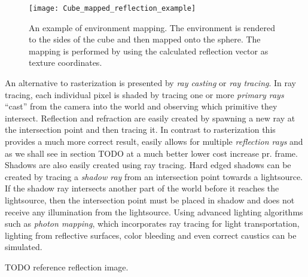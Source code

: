 \begin{figure}
  \centering
  \texttt{[image: Cube\_mapped\_reflection\_example]}
  \caption{An example of environment mapping. The environment is
    rendered to the sides of the cube and then mapped onto the sphere.
    The mapping is performed by using the calculated reflection vector
    as texture coordinates.}
  \label{fig:cubemap}
\end{figure}

An alternative to rasterization is presented by \textit{ray casting}
or \textit{ray tracing}. In ray tracing, each individual pixel is
shaded by tracing one or more \textit{primary rays} ``cast'' from the
camera into the world and observing which primitive they
intersect. Reflection and refraction are easily created by spawning a
new ray at the intersection point and then tracing it. In contrast to
rasterization this provides a much more correct result, easily allows
for multiple \textit{reflection rays} and as we shall see in section
TODO at a much better lower cost increase pr. frame. Shadows are also
easily created using ray tracing. Hard edged shadows can be created by
tracing a \textit{shadow ray} from an intersection point towards a
lightsource. If the shadow ray intersects another part of the world
before it reaches the lightsource, then the intersection point must be
placed in shadow and does not receive any illumination from the
lightsource. Using advanced lighting algorithms such as \textit{photon
  mapping}, which incorporates ray tracing for light transportation,
lighting from reflective surfaces, color bleeding and even correct
caustics can be simulated.

TODO reference reflection image.
\begin{figure}
  \centering


  \label{fig:caustics}
\end{figure}


